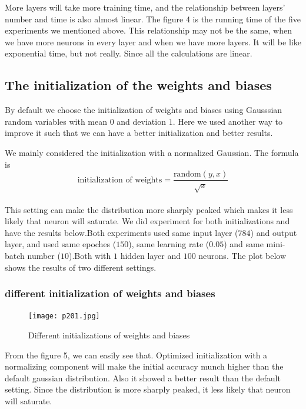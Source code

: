 \documentclass[12pt,a4paper]{article}
\begin{document}
More layers will take more training time, and the relationship between layers' number and time is also almost linear. The figure 4 is the running time of the five experiments we mentioned above. This relationship may not be the same, when we have more neurons in every layer and when we have more layers. It will be like exponential time, but not really. Since all the calculations are linear.\\

\subsection{The initialization of the weights and biases}
By default we choose the initialization of weights and biases using Gausssian random variables with mean $0$ and deviation $1$. Here we used another way to improve it such that we can have a better initialization and better results.

We mainly considered the initialization with a normalized Gaussian. The formula is\\
\[\text{initialization of weights}= \frac{\text{random} (y, x)}{\sqrt{x}}\]\\
This setting can make the distribution more sharply peaked which makes it less likely that neuron will saturate. We did experiment for both initializations and have the results below.Both experiments used same input layer ($784$) and output layer, and used same epoches ($150$), same learning rate ($0.05$) and same mini-batch number ($10$).Both with $1$ hidden layer and $100$ neurons. The plot below shows the results of two different settings.\\
\subsubsection{different initialization of weights and biases}
\begin{figure}
\centering
\texttt{[image: p201.jpg]}
\caption{Different initializations of weights and biases}
\end{figure}
From the figure 5, we can easily see that. Optimized initialization with a normalizing component will make the initial accuracy munch higher than the default gaussian distribution. Also it showed a better result than the default setting. Since the distribution is more sharply peaked, it less likely that neuron will saturate.
\end{document}
